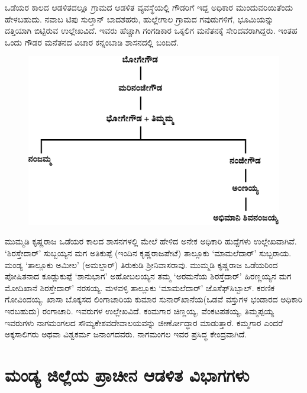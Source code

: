 ಒಡೆಯರ ಕಾಲದ ಆಡಳಿತದಲ್ಲೂ ಗ್ರಾಮದ ಆಡಳಿತ ವ್ಯವಸ್ಥೆಯಲ್ಲಿ ಗೌಡರಿಗೆ ಇದ್ದ ಅಧಿಕಾರ ಮುಂದುವರಿಯಿತೆಂದು ಹೇಳಬಹುದು. ನವಾಬ ಟಿಪು ಸುಲ್ತಾನ್​ ಬಾದಶಹರು, ಹುಲ್ಲೇಗಾಲ ಗ್ರಾಮದ ಗವುಡುಗಳಿಗೆ, ಭೂಮಿಯನ್ನು ದತ್ತಿಯಾಗಿ ಬಿಟ್ಟಿರುವ ಉಲ್ಲೇಖವಿದೆ. ಇವರು ಹೆಚ್ಚಾಗಿ ಗಂಗಡಿಕಾರ ಒಕ್ಕಲಿಗ ಮನೆತನಕ್ಕೆ ಸೇರಿದವರಾಗಿದ್ದರು. ಇಂತಹ ಒಂದು ಗೌಡರ ಮನೆತನದ ವಿಚಾರ ಕನ್ನಂಬಾಡಿ ಶಾಸನದಲ್ಲಿ ಬಂದಿದೆ.

\begin{figure}[H]
\includegraphics[scale=1.3]{images/chap3/chap3fig47.jpeg}
\end{figure}

ಮುಮ್ಮಡಿ ಕೃಷ್ಣರಾಜ ಒಡೆಯರ ಕಾಲದ ಶಾಸನಗಳಲ್ಲಿ ಮೇಲೆ ಹೇಳಿದ ಅನೇಕ ಅಧಿಕಾರಿ ಹುದ್ದೆಗಳು ಉಲ್ಲೇಖವಾಗಿವೆ. ‘ಶಿರಸ್ತೇದಾರ್​’ ಸುಬ್ಬಯ್ಯನ ಮಗ ಅತಿಕುಪ್ಪೆ (ಇಂದಿನ ಕೃಷ್ಣರಾಜಪೇಟೆ) ತಾಲ್ಲೂಕು ‘ಮಾಮಲೆದಾರ್​’ ಸುಬ್ಬರಾಯ. ಮಂಡ್ಯ ‘ತಾಲ್ಲೂಕು ಅಮೀಲ’ (ಅಮಲ್ದಾರ್​) ತಿರುಕುಡಿ ಶ‍್ರೀನಿವಾಸರಾವು. ಮುಮ್ಮಡಿ ಕೃಷ್ಣರಾಜ ಒಡೆಯರಿಂದ ಪೋಷಿತನಾದ ಕೂಡ್ಲುಕುಪ್ಪೆ ‘ಶಾನುಭಾಗ’ ಅಹೋಬಲಯ್ಯನ ತಮ್ಮ ‘ಅರಮನೆಯ ಶಿರಸ್ತೆದಾರ್​’ ಹಿರಣ್ಣಯ್ಯನ ಮಗ ಮೋದಿಖಾನೆ ಶಿರಸ್ತೇದಾರ್​’ ನರಸಯ್ಯ. ಮಳವಳ್ಳಿ ತಾಲ್ಲೂಕು ‘ಮಾಮಲೆದಾರ್​’ ಜೊಸೆಫ್​ ಸಿಬ್ಬಾಲ್​. ಕರಣಿಕ ಗೋವಿಂದಯ್ಯ. ಖಾಸಾ ಬೊಕ್ಕಸದ ಲಿಂಗಾಚಾರಿಯ ಕುಮಾರ ಸುನಾರ್​ಖಾನೆಯ(ಒಡವೆ ವಸ್ತುಗಳ ಭಂಡಾರದ ಅಧಿಕಾರಿ ಇರಬಹುದು) ರಂಗಾಚಾರಿ. ಇವರುಗಳ ಉಲ್ಲೇಖವಿದೆ. ಕಂಮಗಾರ ಚಿಣ್ಣಯ್ಯ, ವೆಂಕಟಪತಯ್ಯ, ತಿಮ್ಮಪ್ಪಯ್ಯ ಇವರುಗಳು ನಾಗಮಂಗಲದ ಸೌಮ್ಯಕೇಶವದೇವಾಲಯವನ್ನು ಜೀರ್ಣೋದ್ಧಾರ ಮಾಡುತ್ತಾರೆ. ಕಮ್ಮಗಾರ ಎಂದರೆ ಅಕ್ಕಸಾಲಿಗರು ಅಥವಾ ವಿಶ್ವಕರ್ಮ ಜನಾಂಗದವರು. ನಾಗಮಂಗಲ ಇವರ ಪ್ರಸಿದ್ಧ ಕೇಂದ್ರವಾಗಿದೆ.


\section{ಮಂಡ್ಯ ಜಿಲ್ಲೆಯ ಪ್ರಾಚೀನ ಆಡಳಿತ ವಿಭಾಗಗಳು}


